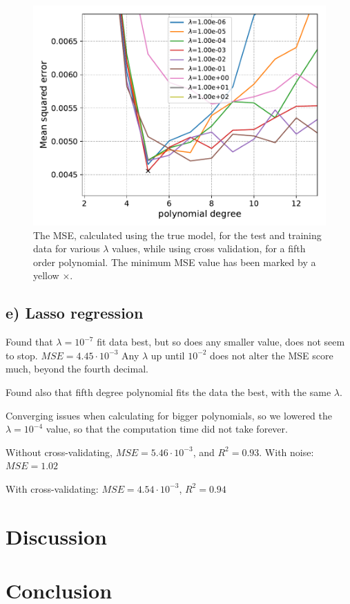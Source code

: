 \documentclass[a4paper,10pt,english]{article}
\begin{document}
\begin{figure}[H]
	\centering
	\includegraphics[scale=0.6]{d_Ridge_MSE_pdegree_lmbda_close.pdf}
	\caption{The MSE, calculated using the true model, for the test and training data for various $\lambda$ values, while using cross validation, for a fifth order polynomial. The minimum MSE value has been marked by a yellow $\times$.}
	\label{fig:6}
\end{figure}

\subsection{e) Lasso regression}
Found that $\lambda=10^{-7}$ fit data best, but so does any smaller value, does not seem to stop. $MSE = 4.45\cdot 10^{-3}$
Any $\lambda$ up until $10^{-2}$ does not alter the MSE score much, beyond the fourth decimal.

Found also that fifth degree polynomial fits the data the best, with the same $\lambda$.

Converging issues when calculating for bigger polynomials, so we lowered the $\lambda=10^{-4}$ value, so that the computation time did not take forever. 

Without cross-validating, $MSE=5.46\cdot 10^{-3}$, and $R^2= 0.93$. With noise: $MSE= 1.02$

With cross-validating: $MSE=4.54 \cdot 10^{-3}$, $R^2=0.94$

\section{Discussion}
\section{Conclusion}



\end{document}
